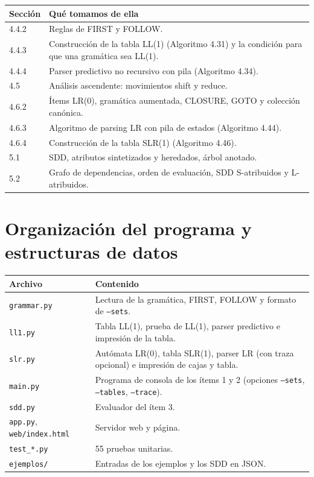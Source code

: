 \documentclass[11pt,a4paper]{article}
\newcommand{\code}[1]{\texttt{#1}}
\begin{document}
\begin{center}
\begin{tabularx}{\textwidth}{@{}lX@{}}
\toprule
Sección & Qué tomamos de ella \\
\midrule
4.4.2 & Reglas de FIRST y FOLLOW. \\
4.4.3 & Construcción de la tabla LL(1) (Algoritmo 4.31) y la condición para que una gramática sea LL(1). \\
4.4.4 & Parser predictivo no recursivo con pila (Algoritmo 4.34). \\
4.5 & Análisis ascendente: movimientos shift y reduce. \\
4.6.2 & Ítems LR(0), gramática aumentada, CLOSURE, GOTO y colección canónica. \\
4.6.3 & Algoritmo de parsing LR con pila de estados (Algoritmo 4.44). \\
4.6.4 & Construcción de la tabla SLR(1) (Algoritmo 4.46). \\
5.1 & SDD, atributos sintetizados y heredados, árbol anotado. \\
5.2 & Grafo de dependencias, orden de evaluación, SDD S-atribuidos y L-atribuidos. \\
\bottomrule
\end{tabularx}
\end{center}

\section{Organización del programa y estructuras de datos}

\begin{center}
\begin{tabularx}{\textwidth}{@{}lX@{}}
\toprule
Archivo & Contenido \\
\midrule
\code{grammar.py} & Lectura de la gramática, FIRST, FOLLOW y formato de \code{--sets}. \\
\code{ll1.py} & Tabla LL(1), prueba de LL(1), parser predictivo e impresión de la tabla. \\
\code{slr.py} & Autómata LR(0), tabla SLR(1), parser LR (con traza opcional) e impresión de cajas y tabla. \\
\code{main.py} & Programa de consola de los ítems 1 y 2 (opciones \code{--sets}, \code{--tables}, \code{--trace}). \\
\code{sdd.py} & Evaluador del ítem 3. \\
\code{app.py}, \code{web/index.html} & Servidor web y página. \\
\code{test\_*.py} & 55 pruebas unitarias. \\
\code{ejemplos/} & Entradas de los ejemplos y los SDD en JSON. \\
\bottomrule
\end{tabularx}
\end{center}
\end{document}
